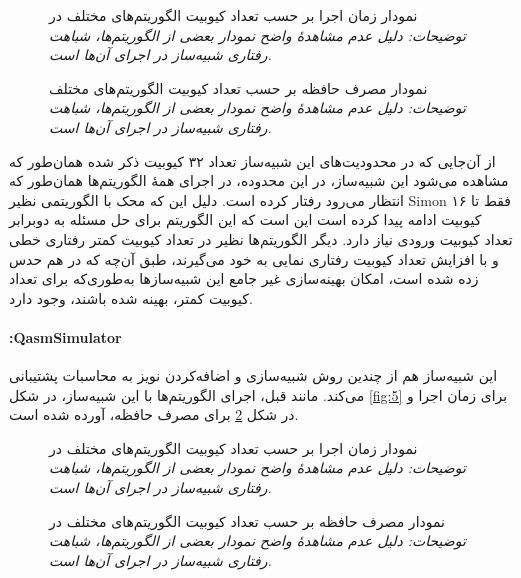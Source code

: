 \begin{figure}
	\centering
	\captionsetup{justification=centering}
	
	\caption[نمودار زمان اجرا ]{
		نمودار زمان اجرا بر حسب تعداد کیوبیت الگوریتم‌های مختلف در
		\newline \textit{
		توضیحات: دلیل عدم مشاهد‌هٔ واضح نمودار بعضی از الگوریتم‌ها، شباهت رفتاری شبیه‌ساز در اجرای آن‌ها است.
		}
		}
	\label{fig:3}
	\vspace{1cm}
	\captionsetup{justification=centering}
	
	\caption[نمودار مصرف حافظه ]{
		نمودار مصرف حافظه بر حسب تعداد کیوبیت الگوریتم‌های مختلف
		\newline \textit{
			توضیحات: دلیل عدم مشاهد‌هٔ واضح نمودار بعضی از الگوریتم‌ها، شباهت رفتاری شبیه‌ساز در اجرای آن‌ها است.
		}
		}
	\label{fig:4}
\end{figure}

 از آن‌جایی که در محدودیت‌های این شبیه‌ساز تعداد ۳۲ کیوبیت ذکر شده همان‌طور که مشاهده می‌شود این شبیه‌ساز، در این محدوده، در اجرای همهٔ الگوریتم‌ها همان‌طور که انتظار می‌رود رفتار کرده است. دلیل این که محک با الگوریتمی نظیر Simon فقط تا ۱۶ کیوبیت ادامه پیدا کرده است این است که این الگوریتم برای حل مسئله به دوبرابر تعداد کیوبیت ورودی نیاز دارد. دیگر الگوریتم‌ها نظیر
 در تعداد کیوبیت کمتر رفتاری خطی و با افزایش تعداد کیوبیت رفتاری نمایی به خود می‌گیرند، طبق آن‌چه که در 
 \cite{jamadagni_benchmarking_2024}
 هم حدس زده شده است، امکان بهینه‌سازی غیر جامع این شبیه‌سازها به‌طوری‌که برای تعداد کیوبیت کمتر، بهینه شده باشند، وجود دارد.
  
  
\paragraph{:QasmSimulator}
این شبیه‌ساز هم از چندین روش شبیه‌سازی و اضافه‌کردن نویز به محاسبات پشتیبانی می‌کند. مانند قبل، اجرای الگوریتم‌ها با این شبیه‌ساز، در شکل‌ \ref{fig:5} برای زمان اجرا و در شکل \ref{fig:6} برای مصرف حافظه، آورده شده است.

\begin{figure}
	\centering
	\captionsetup{justification=centering}
	
	\caption[نمودار زمان اجرا ]{
		نمودار زمان اجرا بر حسب تعداد کیوبیت الگوریتم‌های مختلف در 
		\newline \textit{
			توضیحات: دلیل عدم مشاهد‌هٔ واضح نمودار بعضی از الگوریتم‌ها، شباهت رفتاری شبیه‌ساز در اجرای آن‌ها است.
		}
		}
	\label{fig:5}
	\vspace{1cm}
	\captionsetup{justification=centering}
	
	\caption[نمودار مصرف حافظه ]{
		نمودار مصرف حافظه بر حسب تعداد کیوبیت الگوریتم‌های مختلف در
		\newline \textit{
			توضیحات: دلیل عدم مشاهد‌هٔ واضح نمودار بعضی از الگوریتم‌ها، شباهت رفتاری شبیه‌ساز در اجرای آن‌ها است.
		}
		}
	\label{fig:6}
\end{figure}

